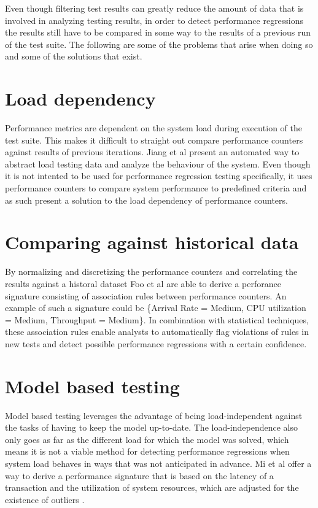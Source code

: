 Even though filtering test results can greatly reduce the amount of data that is involved in analyzing testing results, in order to detect performance regressions the results still have to be compared in some way to the results of a previous run of the test suite. The following are some of the problems that arise when doing so and some of the solutions that exist.

\section{Load dependency}
Performance metrics are dependent on the system load during execution of the test suite. This makes it difficult to straight out compare performance counters against results of previous iterations. Jiang et al present an automated way to abstract load testing data and analyze the behaviour of the system. \cite{jiang2010automated} Even though it is not intented to be used for performance regression testing specifically, it uses performance counters to compare system performance to predefined criteria and as such present a solution to the load dependency of performance counters.

\section{Comparing against historical data}
By normalizing and discretizing the performance counters and correlating the results against a historal dataset Foo et al are able to derive a perforance signature \cite{foo2010mining} consisting of association rules between performance counters. An example of such a signature could be \{Arrival Rate = Medium, CPU utilization = Medium, Throughput = Medium\}. In combination with statistical techniques, these association rules enable analysts to automatically flag violations of rules in new tests and detect possible performance regressions with a certain confidence.

\section{Model based testing}
Model based testing leverages the advantage of being load-independent against the tasks of having to keep the model up-to-date. The load-independence also only goes as far as the different load for which the model was solved, which means it is not a viable method for detecting performance regressions when system load behaves in ways that was not anticipated in advance. Mi et al offer a way to derive a performance signature that is based on the latency of a transaction and the utilization of system resources, which are adjusted for the existence of outliers \cite{mi2008analysis}.


